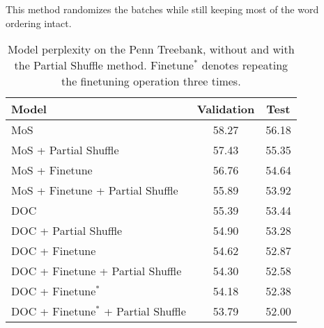 \documentclass[11pt,a4paper]{article}
\begin{document}
This method randomizes the batches while still keeping most of the word ordering intact. 
\begin{table}[t!]
\begin{center}
{\small
\begin{tabular}{@{}lcc@{}}

\toprule
Model                                & Validation & Test  \\ \midrule
MoS                                  & 58.27      & 56.18 \\
MoS + Partial Shuffle              & 57.43      & 55.35 \\
MoS + Finetune                       & 56.76      & 54.64 \\
MoS + Finetune + Partial Shuffle   & 55.89      & 53.92 \\ \midrule
DOC                                  & 55.39      & 53.44 \\
DOC + Partial Shuffle              & 54.90      & 53.28 \\
DOC + Finetune                       & 54.62      & 52.87 \\
DOC + Finetune + Partial Shuffle   & 54.30      & 52.58 \\
DOC + Finetune$^*$                    & 54.18      & 52.38 \\
DOC + Finetune$^*$ + Partial Shuffle & 53.79      & 52.00 \\ \bottomrule

\end{tabular} }
\end{center}
\caption{\label{PTB} Model perplexity on the Penn Treebank, without and with the Partial Shuffle method. Finetune$^*$ denotes repeating the finetuning operation three times.  }
\end{table}
\end{document}
